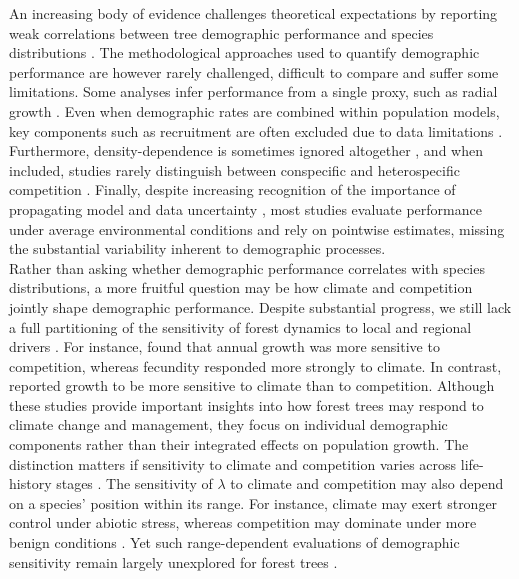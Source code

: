 An increasing body of evidence challenges theoretical expectations by
reporting weak correlations between tree demographic performance and
species distributions
\citep{McGill2012, Thuiller2014, Csergo2017, bohner2020, LeSquin2021, Midolo2021, Guyennon2023}.
The methodological approaches used to quantify demographic performance
are however rarely challenged, difficult to compare and suffer some
limitations. Some analyses infer performance from a single proxy, such
as radial growth \citep[e.g.~][]{McGill2012, bohner2020}. Even when
demographic rates are combined within population models, key components
such as recruitment are often excluded due to data limitations
\citep{Kunstler2021, LeSquin2021}. Furthermore, density-dependence is
sometimes ignored altogether \citep{Csergo2017, Ohse2023}, and when
included, studies rarely distinguish between conspecific and
heterospecific competition \citep{bohner2020, LeSquin2021}. Finally,
despite increasing recognition of the importance of propagating model
and data uncertainty \citep{MilnerGulland2017a, malchow2024calibration},
most studies evaluate performance under average environmental conditions
and rely on pointwise estimates, missing the substantial variability
inherent to demographic processes.\\

Rather than asking whether demographic performance correlates with
species distributions, a more fruitful question may be how climate and
competition jointly shape demographic performance. Despite substantial
progress, we still lack a full partitioning of the sensitivity of forest
dynamics to local and regional drivers \citep{Ohse2023}. For instance,
\citet{Clark2011} found that annual growth was more sensitive to
competition, whereas fecundity responded more strongly to climate. In
contrast, \citet{CopenhaverParry2016} reported growth to be more
sensitive to climate than to competition. Although these studies provide
important insights into how forest trees may respond to climate change
and management, they focus on individual demographic components rather
than their integrated effects on population growth. The distinction
matters if sensitivity to climate and competition varies across
life-history stages \citep{Russell2012, Ettinger2013}. The sensitivity
of \(\lambda\) to climate and competition may also depend on a species'
position within its range. For instance, climate may exert stronger
control under abiotic stress, whereas competition may dominate under
more benign conditions \citep{Louthan2015}. Yet such range-dependent
evaluations of demographic sensitivity remain largely unexplored for
forest trees \citep{Ohse2023}.\\

